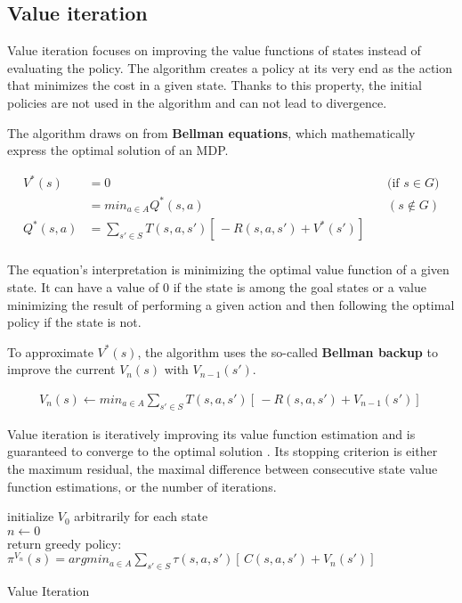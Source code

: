 \subsection{Value iteration} \label{VI}
Value iteration focuses on improving the value functions of states instead of evaluating the policy. The algorithm creates a policy at its very end as the action that minimizes the cost in a given state. Thanks to this property, the initial policies are not used in the algorithm and can not lead to divergence.

The algorithm draws on from \textbf{Bellman equations}, which mathematically express the optimal solution of an MDP.

\begin{equation}
\begin{aligned}
V^* (s) & = 0 && \text{(if $s \in G$)} \\
& = min_{a \in A} Q^* (s, a) &&  (s \notin G) \\ 
Q^* (s, a) & = \sum_{s' \in S} T(s, a, s')[ \,-R(s, a, s') + V^*(s')] \, \\
\end{aligned}
\end{equation}

The equation's interpretation is minimizing the optimal value function of a given state. It can have a value of 0 if the state is among the goal states or a value minimizing the result of performing a given action and then following the optimal policy if the state is not.

To approximate $V^* (s)$, the algorithm uses the so-called \textbf{Bellman backup} to improve the current $V_n (s)$ with $V_{n-1} (s')$.


\begin{equation}
\begin{aligned}
V_n (s) \xleftarrow{} min_{a \in A} \sum_{s' \in S} T(s, a, s') [ \,-R(s, a, s') + V_{n - 1} (s')] \,
\end{aligned}
\end{equation}

Value iteration is iteratively improving its value function estimation and is guaranteed to converge to the optimal solution \cite{Kolobov2012}. Its stopping criterion is either the maximum residual, the maximal difference between consecutive state value function estimations, or the number of iterations.

\LinesNumbered
\begin{algorithm}
\SetAlgoLined
initialize $V_0$ arbitrarily for each state \\
$n \xleftarrow{} 0$ \\ 
return greedy policy: $\pi^{V_n} (s) = argmin_{a \in A} \sum_{s' \in S} \tau(s, a, s')[ \,C(s, a, s') + V_n (s')] \,$
\caption{Value Iteration}
\end{algorithm}


